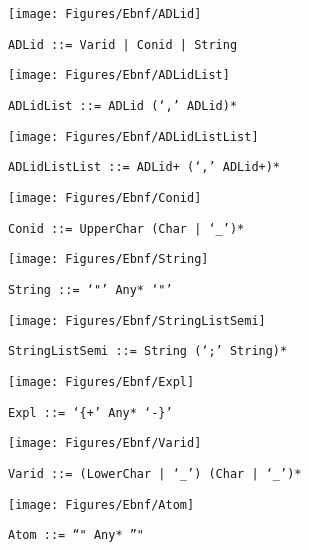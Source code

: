  \begin{figure}[H]
  \centering
  \texttt{[image: Figures/Ebnf/ADLid]}
  \caption*{\texttt{ADLid \small::=  Varid | Conid | String}}
  \label{fig:ebnf-ADLid}
 \end{figure}

 \begin{figure}[H]
  \centering
  \texttt{[image: Figures/Ebnf/ADLidList]}
  \caption*{\texttt{ADLidList \small::=  ADLid (`,' ADLid)*}}
  \label{fig:ebnf-ADLidList}
 \end{figure}

 \begin{figure}[H]
  \centering
  \texttt{[image: Figures/Ebnf/ADLidListList]}
  \caption*{\texttt{ADLidListList \small::=  ADLid+ (`,' ADLid+)*}}
  \label{fig:ebnf-ADLidListList}
 \end{figure}

 \begin{figure}[H]
  \centering
  \texttt{[image: Figures/Ebnf/Conid]}
  \caption*{\texttt{Conid \small::=  UpperChar (Char | `\_')*}}
  \label{fig:ebnf-Conid}
 \end{figure}

 \begin{figure}[H]
  \centering
  \texttt{[image: Figures/Ebnf/String]}
  \caption*{\texttt{String \small::=  `"' Any* `"'}}
  \label{fig:ebnf-String}
 \end{figure}

 \begin{figure}[H]
  \centering
  \texttt{[image: Figures/Ebnf/StringListSemi]}
  \caption*{\texttt{StringListSemi \small::=  String (`;' String)*}}
  \label{fig:ebnf-StringListSemi}
 \end{figure}

 \begin{figure}[H]
  \centering
  \texttt{[image: Figures/Ebnf/Expl]}
  \caption*{\texttt{Expl \small::=  `\{+' Any* `-\}'}}
  \label{fig:ebnf-Expl}
 \end{figure}

 \begin{figure}[H]
  \centering
  \texttt{[image: Figures/Ebnf/Varid]}
  \caption*{\texttt{Varid \small::=  (LowerChar | `\_') (Char | `\_')*}}
  \label{fig:ebnf-Varid}
 \end{figure}

 \begin{figure}[H]
  \centering
  \texttt{[image: Figures/Ebnf/Atom]}
  \caption*{\texttt{Atom \small::=  "`" Any* "'"}}
  \label{fig:ebnf-Atom}
 \end{figure}

